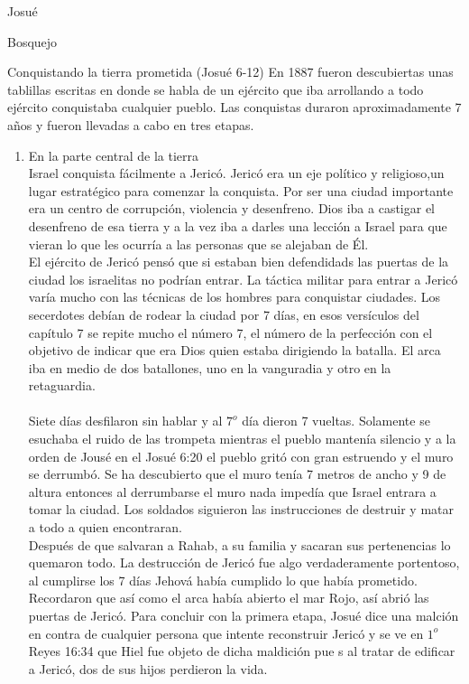 \begin{section}{Josué}
\begin{subsection}{Bosquejo}
		\begin{subsubsection}{Conquistando la tierra prometida (Josué 6-12)}
		En 1887 fueron descubiertas unas tablillas escritas en donde se habla de un ejército que iba arrollando a todo ejército  conquistaba cualquier pueblo. Las conquistas duraron aproximadamente 7 años y fueron llevadas a cabo en tres etapas.
		\begin{enumerate}
			\item En la parte central de la tierra\\
				Israel conquista fácilmente a Jericó. Jericó era un eje político y religioso,un lugar estratégico para comenzar la conquista. Por ser una ciudad importante era un centro de corrupción, violencia y desenfreno. Dios iba a castigar el desenfreno de esa tierra y a la vez iba a darles una lección a Israel para que vieran lo que les ocurría a las personas que se alejaban de Él.\\
				El ejército de Jericó pensó que si estaban bien defendidads las puertas de la ciudad los israelitas no podrían entrar. La táctica militar para entrar a Jericó varía mucho con las técnicas de los hombres para conquistar ciudades. Los secerdotes debían de rodear la ciudad por 7 días, en esos versículos del capítulo 7 se repite mucho el número 7, el número de la perfección con el objetivo de indicar que era Dios quien estaba dirigiendo la batalla. El arca iba en medio de dos batallones, uno en la vanguradia y otro en la retaguardia.\\\\
				Siete días desfilaron sin hablar y al $7^{o}$ día dieron 7 vueltas. Solamente se esuchaba el ruido de las trompeta mientras el pueblo mantenía silencio y a la orden de Jousé en el Josué 6:20 el pueblo gritó con gran estruendo y el muro se derrumbó. Se ha descubierto que el muro tenía 7 metros de ancho y 9 de altura entonces al derrumbarse el muro nada impedía que Israel entrara a tomar la ciudad. Los soldados siguieron las instrucciones de destruir y matar a todo a quien encontraran.\\
				Después de que salvaran a Rahab, a su familia y sacaran sus pertenencias lo quemaron todo. La destrucción de Jericó fue algo verdaderamente portentoso, al cumplirse los 7 días Jehová había cumplido lo que había prometido. Recordaron que así como el arca había abierto el mar Rojo, así abrió las puertas de Jericó. Para concluir con la primera etapa, Josué dice una malción en contra de cualquier persona que intente reconstruir Jericó y se ve en $1^{o}$ Reyes 16:34 que Hiel fue objeto de dicha maldición pue s al tratar de edificar a Jericó, dos de sus hijos perdieron la vida.\\\\

\end{enumerate}
\end{subsubsection}
\end{subsection}
\end{section}
